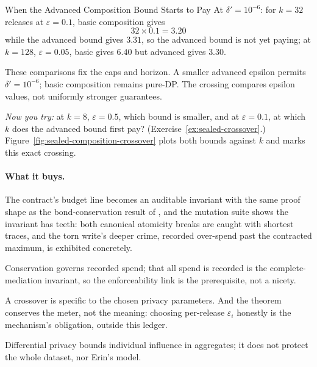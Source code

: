 \documentclass[11pt,a4paper]{article}
\theoremstyle{definition}
\begin{document}
\begin{pdexample}{When the Advanced Composition Bound Starts to Pay}
\setlength{\parskip}{4pt plus 1pt}
At $\delta'=10^{-6}$: for $k=32$ releases at $\varepsilon=0.1$, basic
composition gives
\[
32\times 0.1=3.20
\]
while the advanced bound gives $3.31$, so
the advanced bound is not yet paying; at $k=128$, $\varepsilon=0.05$, basic
gives $6.40$ but advanced gives $3.30$.

These comparisons fix the caps and horizon. A smaller advanced epsilon permits
$\delta'=10^{-6}$; basic composition remains pure-DP. The crossing compares
epsilon values, not uniformly stronger guarantees.

\emph{Now you try:} at $k=8$,
$\varepsilon=0.5$, which bound is smaller, and at $\varepsilon=0.1$, at which
$k$ does the advanced bound first pay? (Exercise~\ref{ex:sealed-crossover}.)
Figure~\ref{fig:sealed-composition-crossover} plots both bounds against $k$
and marks this exact crossing.
\end{pdexample}



\paragraph{What it buys.}
The contract's budget line becomes an auditable invariant with the same proof
shape as the bond-conservation result of , and the mutation suite shows the invariant has teeth: both canonical
atomicity breaks are caught with shortest traces, and the torn write's deeper
crime, recorded over-spend past the contracted maximum, is exhibited
concretely.

\begin{pdboundary}
\setlength{\parskip}{4pt plus 1pt}
Conservation governs recorded spend; that all spend is recorded is the
complete-mediation invariant, so the enforceability link is the prerequisite,
not a nicety.

A crossover is specific to the chosen privacy parameters. And the
theorem conserves the meter, not the meaning: choosing per-release
$\varepsilon_i$ honestly is the mechanism's obligation, outside this ledger.

Differential privacy bounds individual influence in aggregates; it does not
protect the whole dataset, nor Erin's model.
\end{pdboundary}
\end{document}
